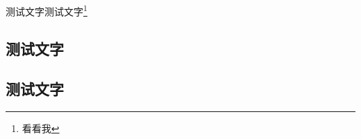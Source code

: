 \begin{Example}
	测试文字测试文字\footnote{看看我}
\end{Example}


\subsection{测试文字}
\subsection*{测试文字}
\zhlipsum[1]


\makeatletter



\makeatother

\begin{multicols}{2}
\Basis

\Complex
\end{multicols}

\zhlipsum[1]

















\clearpage

